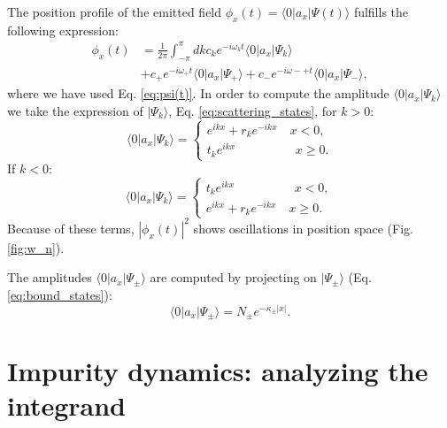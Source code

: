 \documentclass[aps,pra,twocolumn,floatfix,superscriptaddress]{revtex4-1}%
\begin{document}
The position profile of the emitted field $\phi_x(t)=\langle 0|a_x|\Psi(t)\rangle$ fulfills the following expression:
\begin{align}
\phi_x(t)& = \frac{1}{2\pi}\int_{-\pi}^\pi dk c_k e^{-i\omega_k t}\langle 0|a_x|\Psi_k\rangle \\
& + c_+ e^{-i\omega_+ t} \langle 0|a_x|\Psi_+\rangle+ c_- e^{-i\omega-+ t} \langle 0|a_x|\Psi_-\rangle, \nonumber
\end{align}
where we have used Eq. \eqref{eq:psi(t)}. In order to compute the amplitude $\langle 0|a_x|\Psi_k\rangle$ we take the expression of $|\Psi_k\rangle$, Eq. \eqref{eq:scattering_states}, for $k>0$:
\begin{equation}
\langle 0|a_x|\Psi_k\rangle = \left\{ 
\begin{array}{c}
e^{ikx}+r_ke^{-ikx}\quad x<0,\\
t_k e^{ikx} \qquad\qquad\;\;\; x\geq 0.
\end{array}
\right.
\end{equation}
If $k<0$:
\begin{equation}
\langle 0|a_x|\Psi_k\rangle = \left\{ 
\begin{array}{c}
t_k e^{ikx} \qquad\qquad\;\;\; x< 0,\\
e^{ikx}+r_ke^{-ikx}\quad x\geq 0.
\end{array}
\right.
\end{equation}
Because of these terms, $|\phi_x(t)|^2$ shows oscillations in position space (Fig. \ref{fig:w_n}).

The amplitudes $\langle 0|a_x|\Psi_\pm\rangle$ are computed by projecting on $|\Psi_\pm\rangle$ (Eq. \eqref{eq:bound_states}):
\begin{equation}
\langle 0|a_x|\Psi_\pm \rangle= N_\pm e^{-\kappa_\pm |x|}.
\end{equation}



\section{Impurity dynamics: analyzing the integrand}\label{app:integrand}
\end{document}
